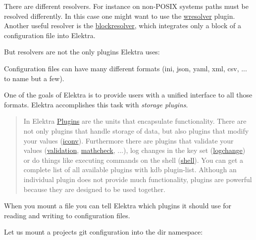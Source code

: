There are different resolvers. For instance on non-\/\+P\+O\+S\+IX systems paths must be resolved differently. In this case one might want to use the \hyperlink{autotoc_md823_src_plugins_wresolver_README_md}{wresolver} plugin. Another useful resolver is the \hyperlink{autotoc_md65_src_plugins_blockresolver_README_md}{blockresolver}, which integrates only a block of a configuration file into Elektra.

But resolvers are not the only plugins Elektra uses\+:

Configuration files can have many different formats ({\ttfamily ini}, {\ttfamily json}, {\ttfamily yaml}, {\ttfamily xml}, {\ttfamily csv}, ... to name but a few).

One of the goals of Elektra is to provide users with a unified interface to all those formats. Elektra accomplishes this task with {\itshape storage plugins}.

\begin{quote}
In Elektra \hyperlink{doc_tutorials_plugins_md}{Plugins} are the units that encapsulate functionality. There are not only plugins that handle storage of data, but also plugins that modify your values (\hyperlink{autotoc_md282_src_plugins_iconv_README_md}{iconv}). Furthermore there are plugins that validate your values (\hyperlink{autotoc_md818_src_plugins_validation_README_md}{validation}, \hyperlink{autotoc_md401_src_plugins_mathcheck_README_md}{mathcheck}, ...), log changes in the key set (\hyperlink{autotoc_md390_src_plugins_logchange_README_md}{logchange}) or do things like executing commands on the shell (\hyperlink{autotoc_md637_src_plugins_shell_README_md}{shell}). You can get a complete list of all available plugins with {\ttfamily kdb plugin-\/list}. Although an individual plugin does not provide much functionality, plugins are powerful because they are designed to be used together. \end{quote}


When you mount a file you can tell Elektra which plugins it should use for reading and writing to configuration files.

Let us mount a projects git configuration into the dir namespace\+:




